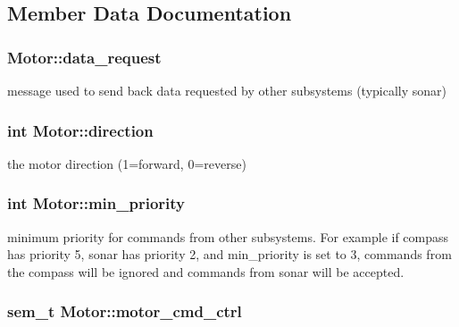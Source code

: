 \subsection{Member Data Documentation}
\hypertarget{classMotor_ab2774f3d9c41683a683f10ef20a29607}{
\subsubsection[{data\-\_\-request}]{ Motor\-::data\-\_\-request\hspace{0.3cm}{\ttfamily [protected]}}}\label{classMotor_ab2774f3d9c41683a683f10ef20a29607}
message used to send back data requested by other subsystems (typically sonar) \hypertarget{classMotor_a7d7c98b5afa45656905708e54ff7fb9a}{
\subsubsection[{direction}]{\setlength{\rightskip}{0pt plus 5cm}int Motor\-::direction\hspace{0.3cm}{\ttfamily [protected]}}}\label{classMotor_a7d7c98b5afa45656905708e54ff7fb9a}
the motor direction (1=forward, 0=reverse) \hypertarget{classMotor_a0125717053068acb08b430d820bfc413}{
\subsubsection[{min\-\_\-priority}]{\setlength{\rightskip}{0pt plus 5cm}int Motor\-::min\-\_\-priority\hspace{0.3cm}{\ttfamily [protected]}}}\label{classMotor_a0125717053068acb08b430d820bfc413}
minimum priority for commands from other subsystems. For example if compass has priority 5, sonar has priority 2, and min\-\_\-priority is set to 3, commands from the compass will be ignored and commands from sonar will be accepted. \hypertarget{classMotor_a827a1d2b453a804d389cdafbf0685022}{
\subsubsection[{motor\-\_\-cmd\-\_\-ctrl}]{\setlength{\rightskip}{0pt plus 5cm}sem\-\_\-t Motor\-::motor\-\_\-cmd\-\_\-ctrl\hspace{0.3cm}{\ttfamily [protected]}}}\label{classMotor_a827a1d2b453a804d389cdafbf0685022}
